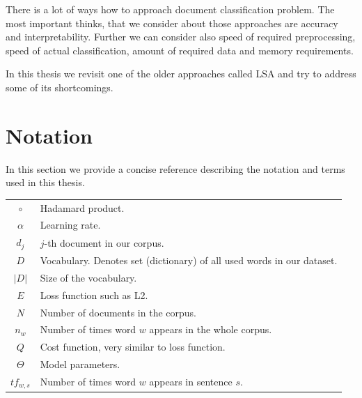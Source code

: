     There is a lot of ways how to approach document classification problem. 
    The most important thinks, that we consider about those approaches are accuracy and interpretability.
    Further we can consider also speed of required preprocessing, speed of actual classification, amount of required data and memory requirements. 
    
    In this thesis we revisit one of the older approaches called LSA and try to address some of its shortcomings.
    
    \* %

    \* %

\section{Notation}

    In this section we provide a concise reference describing the notation and terms used in this thesis.
    
    \begin{table}[h]
        \centering
        \begin{tabular}{c l}
            $\circ$ & Hadamard product. \\
            $\alpha$ & Learning rate. \\
            $d_j$ & $j$-th document in our corpus.\\
            $D$ & Vocabulary. Denotes set (dictionary) of all used words in our dataset. \\
            $|D|$ & Size of the vocabulary. \\
            $E$ & Loss function such as L2.\\
            $N$ & Number of documents in the corpus. \\
            $n_w$ & Number of times word $w$ appears in the whole corpus. \\
            $Q$ & Cost function, very similar to loss function.\\
            $\Theta$ & Model parameters.\\
            $tf_{w,s}$ & Number of times word $w$ appears in sentence $s$. \\
            
        \end{tabular}
    \end{table}
    
